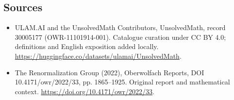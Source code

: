 \documentclass[11pt]{article}
\begin{document}
\subsection{Sources}
\begin{itemize}
\item[\hypertarget{source:30005177:1}{S1}] ULAM.AI and the UnsolvedMath Contributors, UnsolvedMath, record 30005177 (OWR-11101914-001). Catalogue curation under CC BY 4.0; definitions and English exposition added locally.
\url{https://huggingface.co/datasets/ulamai/UnsolvedMath}.
\item[\hypertarget{source:30005177:2}{S2}] The Renormalization Group (2022), Oberwolfach Reports, DOI 10.4171/owr/2022/33, pp. 1865--1925. Original report and mathematical context.
\url{https://doi.org/10.4171/owr/2022/33}.
\end{itemize}
\label{end:30005177}
\end{document}
